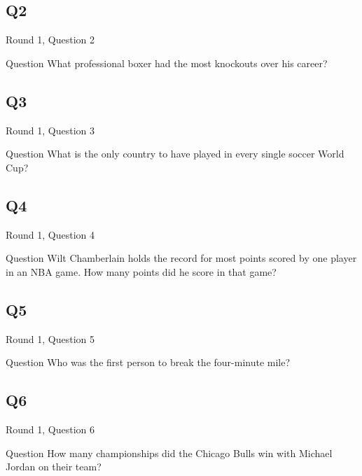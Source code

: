 \documentclass[11pt]{beamer}
\begin{document}
\subsection*{Q2}
\begin{frame}[t]{Round 1, Question 2}
\vspace{0.5em}
\begin{block}{Question}
What professional boxer had the most knockouts over his career?
\end{block}
\end{frame}
    

\subsection*{Q3}
\begin{frame}[t]{Round 1, Question 3}
\vspace{0.5em}
\begin{block}{Question}
What is the only country to have played in every single soccer World Cup?
\end{block}
\end{frame}
    

\subsection*{Q4}
\begin{frame}[t]{Round 1, Question 4}
\vspace{0.5em}
\begin{block}{Question}
Wilt Chamberlain holds the record for most points scored by one player in an NBA game. How many points did he score in that game?
\end{block}
\end{frame}
    

\subsection*{Q5}
\begin{frame}[t]{Round 1, Question 5}
\vspace{0.5em}
\begin{block}{Question}
Who was the first person to break the four-minute mile?
\end{block}
\end{frame}
    

\subsection*{Q6}
\begin{frame}[t]{Round 1, Question 6}
\vspace{0.5em}
\begin{block}{Question}
How many championships did the Chicago Bulls win with Michael Jordan on their team?
\end{block}
\end{frame}
    
\end{document}

